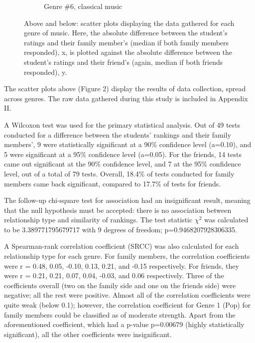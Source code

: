 \documentclass[12pt]{report}
\begin{document}
\begin{figure}[H]
\begin{centering}
\begin{subfigure}{0.3\textwidth}
  \caption{\small Genre \#6, classical music}
\end{subfigure}

\caption{\small Above and below: scatter plots displaying the data gathered for each genre of music. Here, the absolute difference between the student's ratings and their family member's (median if both family members responded), x, is plotted against the absolute difference between the student's ratings and their friend's (again, median if both friends responded), y.}
\end{centering}
\end{figure}

The scatter plots above (Figure 2) display the results of data collection, spread across genres. The raw data gathered during this study is included in Appendix II.

A Wilcoxon test was used for the primary statistical analysis. Out of 49 tests conducted for a difference between the students' rankings and their family members', 9 were statistically significant at a 90\% confidence level (a=0.10), and 5 were significant at a 95\% confidence level (a=0.05). For the friends, 14 tests came out significant at the 90\% confidence level, and 7 at the 95\% confidence level, out of a total of 79 tests. Overall, 18.4\% of tests conducted for family members came back significant, compared to 17.7\% of tests for friends.

The follow-up chi-square test for association had an insignificant result, meaning that the null hypothesis must be accepted: there is no association between relationship type and similarity of rankings. The test statistic $\chi^2$ was calculated to be 3.389771795679717 with 9 degrees of freedom; p=0.9468207928306335.

A Spearman-rank correlation coefficient (SRCC) was also calculated for each relationship type for each genre. For family members, the correlation coefficients were r = 0.48, 0.05, -0.10, 0.13, 0.21, and -0.15 respectively. For friends, they were r = 0.21, 0.21, 0.07, 0.04, -0.03, and 0.06 respectively. Three of the coefficients overall (two on the family side and one on the friends side) were negative; all the rest were positive. Almost all of the correlation coefficients were quite weak (below 0.1); however, the correlation coefficient for Genre 1 (Pop) for family members could be classified as of moderate strength. Apart from the aforementioned coefficient, which had a p-value p=0.00679 (highly statistically significant), all the other coefficients were insignificant.
\end{document}

